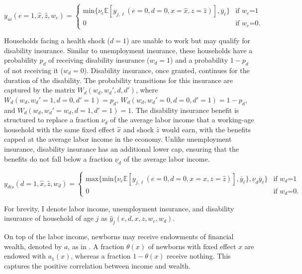 \documentclass[parskip=full]{article}
\begin{document}
\begin{equation}
y_{ui}(e=1,\hat{x},\hat{z},w_{e}) = \begin{cases}
\mbox{min}\{\nu_{e} \mathbb{E}[y_{j,\ell}(e=0,d=0,x=\hat{x},z=\hat{z})],\overline{y}_{\ell}\} &\text{if $w_{e}$=1} \\
0 &\text{if $w_{e}$=0}.
\end{cases}
\end{equation}

Households facing a health shock ($d=1$) are unable to work but may qualify for disability insurance. Similar to unemployment insurance, these households have a probability $p_{d}$ of receiving disability insurance ($w_{d}=1$) and a probability $1-p_{d}$ of not receiving it ($w_{d}=0$). Disability insurance, once granted, continues for the duration of the disability. The probability transitions for this insurance are captured by the matrix $W_{d}(w_{d},w_{d}',d,d')$, where $W_{d}(w_{d},w_{d}'=1,d=0,d'=1)=p_{d}$, $W_{d}(w_{d},w_{d}'=0,d=0,d'=1)=1-p_{d}$, and $W_{d}(w_{d},w_{d}'=w_{d},d=1,d'=1)=1$. The disability insurance benefit is structured to replace a fraction $\nu_{d}$ of the average labor income that a working-age household with the same fixed effect $\hat{x}$ and shock $\hat{z}$ would earn, with the benefits capped at the average labor income in the economy. Unlike unemployment insurance, disability insurance has an additional lower cap, ensuring that the benefits do not fall below a fraction $\underline{\nu}_{d}$ of the average labor income.

\begin{equation}
y_{dis}(d=1,\hat{x},\hat{z},w_{d}) = \begin{cases}
\mbox{max}\{\mbox{min}\{\nu_{e} \mathbb{E}[y_{j,\ell}(e=0,d=0,x=\hat{x},z=\hat{z})],\overline{y}_{\ell}\},\underline{\nu}_{d}\overline{y}_{\ell}\} &\text{if $w_{d}$=1} \\
0 &\text{if $w_{d}$=0}.
\end{cases}
\end{equation}

\noindent For brevity, I denote labor income, unemployment insurance, and disability insurance of household of age $j$ as $\hat{y}_{j}(e,d,x,z,w_{e},w_{d})$.

On top of the labor income, newborns may receive endowments of financial wealth, denoted by $a$, as in \cite{kaplan2014model}. A fraction $\theta(x)$ of newborns with fixed effect $x$ are endowed with $a_1(x)$, whereas a fraction $1-\theta(x)$ receive nothing. This captures the positive correlation between income and wealth.
\end{document}
